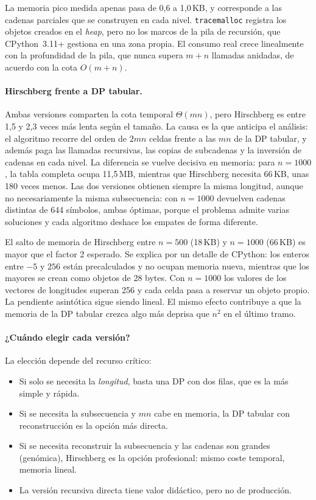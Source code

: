 \documentclass[11pt,a4paper]{article}
\begin{document}
La memoria pico medida apenas pasa de 0,6 a 1,0\,KB, y corresponde a las
cadenas parciales que se construyen en cada nivel. \texttt{tracemalloc}
registra los objetos creados en el \emph{heap}, pero no los marcos de la
pila de recursión, que CPython~3.11+ gestiona en una zona propia. El
consumo real crece linealmente con la profundidad de la pila, que nunca
supera $m+n$ llamadas anidadas, de acuerdo con la cota $O(m+n)$.

\paragraph{Hirschberg frente a DP tabular.}
Ambas versiones comparten la cota temporal $\Theta(mn)$, pero
Hirschberg es entre 1,5 y 2,3 veces más lenta según el tamaño. La causa
es la que anticipa el análisis: el algoritmo recorre del orden de $2mn$
celdas frente a las $mn$ de la DP tabular, y además paga las llamadas
recursivas, las copias de subcadenas y la inversión de cadenas en cada
nivel. La diferencia se vuelve decisiva en memoria: para $n=1000$, la
tabla completa ocupa 11,5\,MB, mientras que Hirschberg necesita 66\,KB,
unas 180 veces menos. Las dos versiones obtienen siempre la misma
longitud, aunque no necesariamente la misma subsecuencia: con $n=1000$
devuelven cadenas distintas de 644 símbolos, ambas óptimas, porque el
problema admite varias soluciones y cada algoritmo deshace los empates
de forma diferente.

El salto de memoria de Hirschberg entre $n=500$ (18\,KB) y $n=1000$
(66\,KB) es mayor que el factor 2 esperado. Se explica por un detalle de
CPython: los enteros entre $-5$ y $256$ están precalculados y no ocupan
memoria nueva, mientras que los mayores se crean como objetos de 28
bytes. Con $n=1000$ los valores de los vectores de longitudes superan 256
y cada celda pasa a reservar un objeto propio. La pendiente asintótica
sigue siendo lineal. El mismo efecto contribuye a que la memoria de la DP
tabular crezca algo más deprisa que $n^{2}$ en el último tramo.

\paragraph{¿Cuándo elegir cada versión?}
La elección depende del recurso crítico:
\begin{itemize}
    \item Si solo se necesita la \emph{longitud}, basta una DP con dos
          filas, que es la más simple y rápida.
    \item Si se necesita la subsecuencia y $mn$ cabe en memoria, la DP
          tabular con reconstrucción es la opción más directa.
    \item Si se necesita reconstruir la subsecuencia y las cadenas son
          grandes (genómica), Hirschberg es la opción profesional:
          mismo coste temporal, memoria lineal.
    \item La versión recursiva directa tiene valor didáctico, pero no de
          producción.
\end{itemize}
\end{document}
